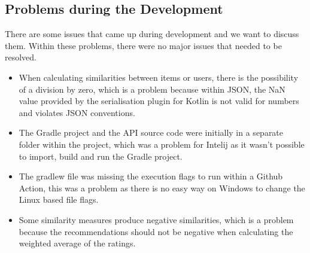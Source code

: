 \subsection{Problems during the Development}

There are some issues that came up during development and we want to discuss them. Within these problems, there were no major issues that needed to be resolved.

\begin{itemize}
    \item When calculating similarities between items or users, there is the possibility of a division by zero, which is a problem because within JSON, the NaN value provided by the serialisation plugin for Kotlin is not valid for numbers and violates JSON conventions.
    \item The Gradle project and the API source code were initially in a separate folder within the project, which was a problem for Intelij as it wasn't possible to import, build and run the Gradle project.
    \item The gradlew file was missing the execution flags to run within a Github Action, this was a problem as there is no easy way on Windows to change the Linux based file flags.
    \item Some similarity measures produce negative similarities, which is a problem because the recommendations should not be negative when calculating the weighted average of the ratings.
\end{itemize}
